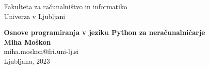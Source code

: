 \clearpage
\begin{center}
{\small Fakulteta za računalništvo in informatiko \\
 Univerza v Ljubljani\\}
\vspace{5cm}

 {\huge\bfseries\sffamily\color{chapter_col} Osnove programiranja v jeziku Python za neračunalničarje\\}
 \vspace{3cm}
 {\large\bfseries Miha Moškon}\\[5pt]
 miha.moskon@fri.uni-lj.si\\[14pt]
  \vspace{2cm}
 \vfill
{Ljubljana, 2023}
\end{center}
\thispagestyle{empty}
